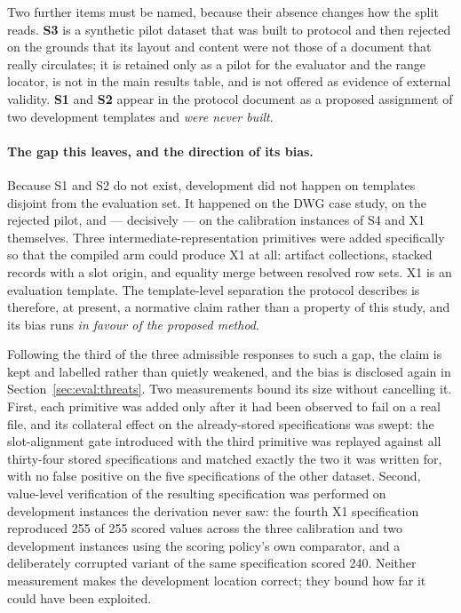Two further items must be named, because their absence changes how the split reads.
\textbf{S3} is a synthetic pilot dataset that was built to protocol and then rejected on the
grounds that its layout and content were not those of a document that really circulates; it
is retained only as a pilot for the evaluator and the range locator, is not in the main
results table, and is not offered as evidence of external validity. \textbf{S1} and
\textbf{S2} appear in the protocol document as a proposed assignment of two development
templates and \emph{were never built}.

\paragraph{The gap this leaves, and the direction of its bias.}
Because S1 and S2 do not exist, development did not happen on templates disjoint from the
evaluation set. It happened on the DWG case study, on the rejected pilot, and --- decisively
--- on the calibration instances of S4 and X1 themselves. Three intermediate-representation
primitives were added specifically so that the compiled arm could produce X1 at all: artifact
collections, stacked records with a slot origin, and equality merge between resolved row sets.
X1 is an evaluation template. The template-level separation the protocol describes is
therefore, at present, a normative claim rather than a property of this study, and its bias
runs \emph{in favour of the proposed method}.

Following the third of the three admissible responses to such a gap, the claim is kept and
labelled rather than quietly weakened, and the bias is disclosed again in
Section~\ref{sec:eval:threats}. Two measurements bound its size without cancelling it. First,
each primitive was added only after it had been observed to fail on a real file, and its
collateral effect on the already-stored specifications was swept: the slot-alignment gate
introduced with the third primitive was replayed against all thirty-four stored
specifications and matched exactly the two it was written for, with no false positive on the
five specifications of the other dataset. Second, value-level verification of the resulting
specification was performed on development instances the derivation never saw: the fourth X1
specification reproduced 255 of 255 scored values across the three calibration and two
development instances using the scoring policy's own comparator, and a deliberately corrupted
variant of the same specification scored 240. Neither measurement makes the development
location correct; they bound how far it could have been exploited.

